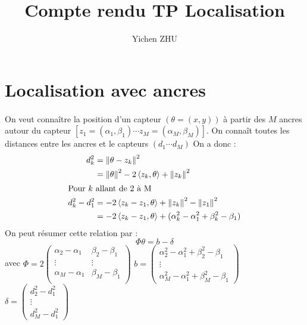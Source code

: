 \documentclass{article}
\author{Yichen ZHU}
\title{Compte rendu TP Localisation}
\begin{document}
\maketitle

\section{Localisation avec ancres}
\paragraph{} On veut conna\^itre la position d'un capteur $(\theta=(x,y))$ \`a partir des $M$ ancres autour du capteur $[z_{1}=(\alpha_{1},\beta_{1}) \cdots z_{M}=(\alpha_{M},\beta_{M})]$. On conna\^it toutes les distances entre les ancres et le capteurs $(d_{1} \cdots d_{M})$ On a donc :
\begin{align*}
d^{2}_{k} &= \left\|\theta-z_{k}\right\|^{2} \\
          &= \left\|\theta\right\|^{2} - 2\left\langle z_{k},\theta\right\rangle + \left\|z_{k}\right\|^{2}\\
\intertext{Pour $k$ allant de 2 \`a M}
d^{2}_{k} - d^{2}_{1} &= -2\left\langle z_{k}-z_{1},\theta\right\rangle + \left\|z_{k}\right\|^{2} - \left\|z_{1}\right\|^{2} \\
											&= -2\left\langle z_{k}-z_{1},\theta\right\rangle + (\alpha^{2}_{k}-\alpha^{2}_{1}+\beta^{2}_{k}-\beta_{1})
\end{align*}
On peut r\'esumer cette relation par : 
\[
\Phi\theta = b - \delta
\]
avec $\Phi = 2\begin{pmatrix}                               
								\alpha_{2}-\alpha_{1} & \beta_{2}-\beta_{1} \\
								\vdots         &        \vdots \\
								\alpha_{M}-\alpha_{1} & \beta_{M}-\beta_{1} \\
							\end{pmatrix}$
			$b = \begin{pmatrix}	
						\alpha^{2}_{2}-\alpha^{2}_{1}+\beta^{2}_{2}-\beta_{1} \\
						\vdots \\
						\alpha^{2}_{M}-\alpha^{2}_{1}+\beta^{2}_{M}-\beta_{1}
					\end{pmatrix}$
			$\delta = \begin{pmatrix}
								 d^{2}_{2} - d^{2}_{1} \\
								 \vdots \\
								 d^{2}_{M} - d^{2}_{1}
							 \end{pmatrix}$
\end{document}
